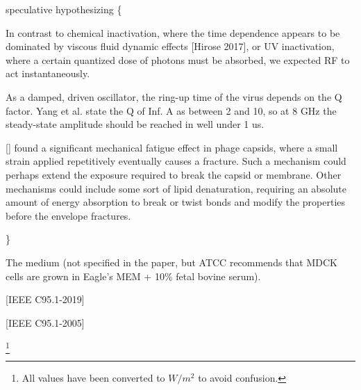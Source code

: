 \documentclass[fleqn,10pt]{article}
\begin{document}
{\color{red} speculative hypothesizing \{ } 

In contrast to chemical inactivation, where the time dependence appears to be dominated by viscous fluid dynamic effects [Hirose 2017], or UV inactivation, where a certain quantized dose of photons must be absorbed, we expected RF to act instantaneously.

As a damped, driven oscillator, the ring-up time of the virus depends on the Q factor. Yang et al. state the Q of Inf. A as between 2 and 10, so at 8 GHz the steady-state amplitude should be reached in well under 1 us. 

[] found a significant mechanical fatigue effect in phage capsids, where a small strain applied repetitively eventually causes a fracture. Such a mechanism could perhaps extend the exposure required to break the capsid or membrane. Other mechanisms could include some sort of lipid denaturation, requiring an absolute amount of energy absorption to break or twist bonds and modify the properties before the envelope fractures.


{\color{red}  \} } 


The medium (not specified in the paper, but ATCC recommends that MDCK cells are grown in Eagle's MEM + 10\% fetal bovine serum).




[IEEE C95.1-2019]

[IEEE C95.1-2005]

\footnote{All values have been converted to $W/m^2$ to avoid confusion.}
\end{document}
